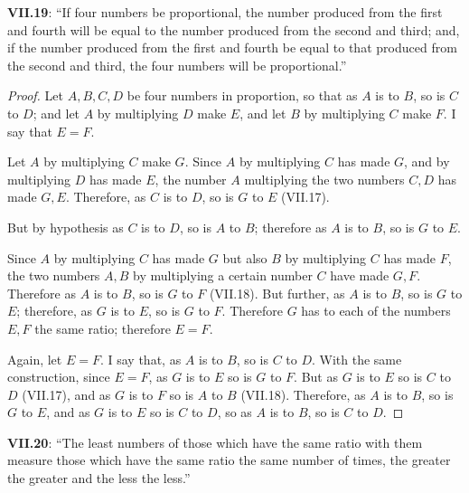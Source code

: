 \documentclass{article}
\begin{document}
\textbf{VII.19}: ``If four numbers be proportional, the number produced from the first and fourth will be equal to the number produced from the second and third; and, if the number produced from the first and fourth be equal to that produced from the second and third, the four numbers will be proportional.''

\begin{proof}
Let $A,B,C,D$ be four numbers in proportion, so that as $A$ is to $B$, so is $C$ to $D$;
and let $A$ by multiplying $D$ make $E$, and let $B$ by multiplying $C$ make $F$. I say that $E=F$.

Let $A$ by multiplying $C$ make $G$. Since $A$ by multiplying $C$ has made $G$, and by multiplying $D$ has made $E$, the number
$A$ multiplying the two numbers $C,D$ has made $G,E$.
Therefore, as $C$ is to $D$, so is $G$ to $E$ (VII.17).

But by hypothesis as $C$ is to $D$, so is $A$ to $B$; therefore as $A$ is to $B$, so is $G$ to $E$.

Since $A$ by multiplying $C$ has made $G$ but also $B$ by multiplying $C$ has made $F$, the two numbers $A,B$ by multiplying a certain number $C$
have made $G,F$. Therefore as $A$ is to $B$, so is $G$ to $F$ (VII.18).
But further, as $A$ is to $B$, so is $G$ to $E$; therefore,
as $G$ is to $E$, so is $G$ to $F$. Therefore $G$ has to each of the numbers $E,F$ the same ratio; therefore $E=F$.

Again, let $E=F$. I say that, as $A$ is to $B$, so is $C$ to $D$.
With the same construction, since $E=F$, as $G$ is to $E$ so is $G$ to $F$. But as $G$ is to $E$ so is $C$ to $D$ (VII.17),
and as $G$ is to $F$ so is $A$ to $B$ (VII.18). Therefore, as $A$ is to $B$, so is $G$ to $E$, and as $G$ is to $E$ so is $C$ to $D$, so
as $A$ is to $B$, so is $C$ to $D$.
\end{proof}

\textbf{VII.20}: ``The least numbers of those which have the same ratio with them measure those which have the same ratio the same number of times, the greater the greater and the less the less.''
\end{document}
